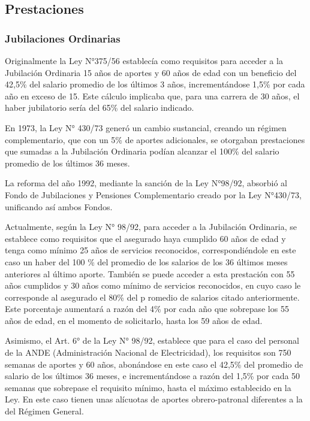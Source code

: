 \subsection{Prestaciones}

\subsubsection{Jubilaciones Ordinarias}

Originalmente la Ley N°375/56 establecía como requisitos para acceder a
la Jubilación Ordinaria 15 años de aportes y 60 años de edad con un
beneficio del 42,5\% del salario promedio de los últimos 3 años,
incrementándose 1,5\% por cada año en exceso de 15. Este cálculo
implicaba que, para una carrera de 30 años, el haber jubilatorio sería
del 65\% del salario indicado.

En 1973, la Ley N° 430/73 generó un cambio sustancial, creando un
régimen complementario, que con un 5\% de aportes adicionales, se
otorgaban prestaciones que sumadas a la Jubilación Ordinaria podían
alcanzar el 100\% del salario promedio de los últimos 36 meses.

La reforma del año 1992, mediante la sanción de la Ley N°98/92, absorbió
al Fondo de Jubilaciones y Pensiones Complementario creado por la Ley
N°430/73, unificando así ambos Fondos.

Actualmente, según la Ley N° 98/92, para acceder a la Jubilación
Ordinaria, se establece como requisitos que el asegurado haya cumplido
60 años de edad y tenga como mínimo 25 años de servicios reconocidos,
correspondiéndole en este caso un haber del 100 \% del promedio de los
salarios de los 36 últimos meses anteriores al último aporte. También se
puede acceder a esta prestación con 55 años cumplidos y 30 años como
mínimo de servicios reconocidos, en cuyo caso le corresponde al
asegurado el 80\% del p romedio de salarios citado anteriormente. Este
porcentaje aumentará a razón del 4\% por cada año que sobrepase los 55
años de edad, en el momento de solicitarlo, hasta los 59 años de edad.

Asimismo, el Art. 6° de la Ley N° 98/92, establece que para el caso del
personal de la ANDE (Administración Nacional de Electricidad), los
requisitos son 750 semanas de aportes y 60 años, abonándose en este caso
el 42,5\% del promedio de salario de los últimos 36 meses, e
incrementándose a razón del 1,5\% por cada 50 semanas que sobrepase el
requisito mínimo, hasta el máximo establecido en la Ley. En este caso
tienen unas alícuotas de aportes obrero-patronal diferentes a la del
Régimen General.

